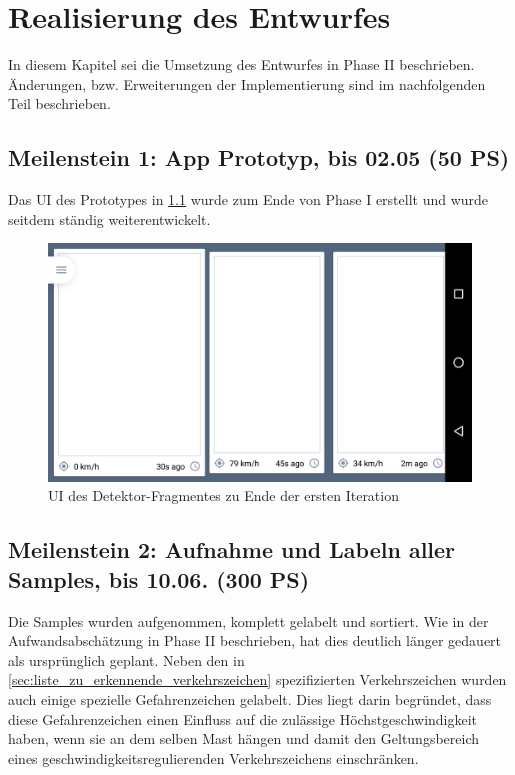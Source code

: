 \documentclass[12pt,a4paper,ngerman,enabledeprecatedfontcommands]{scrreprt}
\begin{document}
\chapter{Realisierung des Entwurfes}

In diesem Kapitel sei die Umsetzung des Entwurfes in Phase II beschrieben. Änderungen, bzw. Erweiterungen der Implementierung sind im nachfolgenden Teil beschrieben.

\section[Meilenstein 1: App Prototyp]{Meilenstein 1: App Prototyp, bis 02.05 (50 PS)}
Das \gls{UI} des Prototypes in \cref{fig:detektor_ui} wurde zum Ende von Phase I erstellt und wurde seitdem ständig weiterentwickelt.\\

\begin{figure}[H]
\centering
\includegraphics[width=0.9\linewidth]{Reviewdokument/Grafiken/app_detector_screenshot_old.png}
\caption{\gls{UI} des Detektor-Fragmentes zu Ende der ersten Iteration}
\label{fig:detektor_ui}
\end{figure}

\section[Meilenstein 2: Aufnahme und Labeln aller Samples]{Meilenstein 2: Aufnahme und Labeln aller Samples, bis 10.06. (300 PS)}

Die Samples wurden aufgenommen, komplett gelabelt und sortiert. Wie in der Aufwandsabschätzung in Phase II beschrieben, hat dies deutlich länger gedauert als ursprünglich geplant. Neben den in \cref{sec:liste_zu_erkennende_verkehrszeichen} spezifizierten Verkehrszeichen wurden auch einige spezielle Gefahrenzeichen gelabelt. Dies liegt darin begründet, dass diese Gefahrenzeichen einen Einfluss auf die zulässige Höchstgeschwindigkeit haben, wenn sie an dem selben Mast hängen und damit den Geltungsbereich  eines geschwindigkeitsregulierenden Verkehrszeichens einschränken.\\
\end{document}

